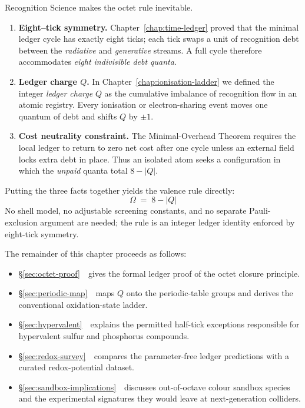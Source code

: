 \documentclass[11pt,oneside]{book}
\begin{document}
Recognition Science makes the octet rule inevitable.

\begin{enumerate}[label=\textbf{\arabic*.}, leftmargin=1.2cm]
\item  \textbf{Eight–tick symmetry.}  
        Chapter~\ref{chap:time-ledger} proved that the minimal ledger cycle
        has exactly eight ticks; each tick swaps a unit of recognition debt
        between the \emph{radiative} and \emph{generative} streams.  A full
        cycle therefore accommodates \emph{eight indivisible debt quanta}.
\item  \textbf{Ledger charge \(Q\).}  
        In Chapter~\ref{chap:ionisation-ladder} we defined the integer
        \emph{ledger charge} \(Q\) as the cumulative imbalance of recognition
        flow in an atomic registry.  Every ionisation or electron-sharing
        event moves one quantum of debt and shifts \(Q\) by \(\pm1\).
\item  \textbf{Cost neutrality constraint.}  
        The Minimal-Overhead Theorem requires the local ledger to return to
        zero net cost after one cycle unless an external field locks extra
        debt in place.  Thus an isolated atom seeks a configuration in which
        the \emph{unpaid} quanta total \(8-|Q|\).
\end{enumerate}

Putting the three facts together yields the valence rule directly:
\[
   \boxed{\;\Omega \;=\; 8 - |Q|\;}
\]
No shell model, no adjustable screening constants, and no separate
Pauli-exclusion argument are needed; the rule is an integer ledger
identity enforced by eight-tick symmetry.

The remainder of this chapter proceeds as follows:

\begin{itemize}
  \item \S\ref{sec:octet-proof} gives the formal ledger proof of the
        octet closure principle.
  \item \S\ref{sec:periodic-map} maps \(Q\) onto the periodic-table groups
        and derives the conventional oxidation-state ladder.
  \item \S\ref{sec:hypervalent} explains the permitted half-tick exceptions
        responsible for hypervalent sulfur and phosphorus compounds.
  \item \S\ref{sec:redox-survey} compares the parameter-free ledger
        predictions with a curated redox-potential dataset.
  \item \S\ref{sec:sandbox-implications} discusses out-of-octave colour
        sandbox species and the experimental signatures they would leave
        at next-generation colliders.
\end{itemize}
\end{document}
